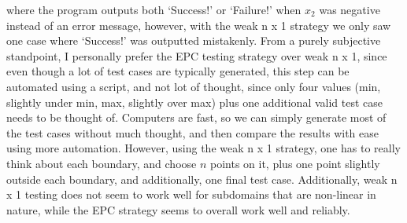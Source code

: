 \documentclass[letterpaper]{article}
\begin{document}
where the program outputs both `Success!'                       
or `Failure!' when $x_2$ was negative instead of an error message, however,
with the weak n x 1 strategy we only saw one case where
`Success!' was outputted mistakenly. From a purely subjective standpoint,
I personally prefer the EPC testing strategy over weak n x 1, since
even though a lot of test cases are typically generated, this step can be
automated using a script, and not lot of thought, since only four values
(min, slightly under min, max, slightly over max) plus one additional
valid test case needs to be thought of. Computers are fast, so we can simply
generate most of the test cases without much thought, and then compare the
results with ease using more automation. However, using the weak n x 1
strategy, one has to really think about each boundary, and choose $n$ points on
it, plus one point slightly outside each boundary, and additionally, one final
test case. Additionally, weak n x 1 testing does not seem to work well for
subdomains that are non-linear in nature, while the EPC strategy seems to
overall work well and reliably.



\vfill
\appendix






\end{document}
